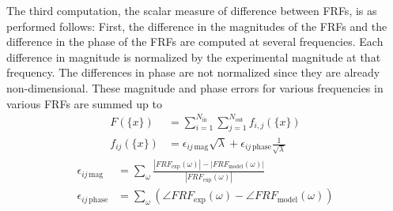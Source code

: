 The third computation, the scalar measure of difference between FRFs, is as performed follows:
First, the difference in the magnitudes of the FRFs and the difference in the phase of the FRFs are computed at several frequencies. Each difference in magnitude is normalized by the experimental magnitude at that frequency. The differences in phase are not normalized since they are already non-dimensional. These magnitude and phase errors for various frequencies in various FRFs are summed up to 
\begin{align}
	F(\{x\}) &= \sum_{i=1}^{N_\text{in}} \sum_{j=1}^{N_\text{out}} f_{i,j}(\{x\}) \\
	f_{ij}(\{x\}) &= \epsilon_{ij \, \text{mag}} \sqrt{\lambda} + \epsilon_{ij \, \text{phase}} \frac{1}{\sqrt{\lambda}}
\end{align}
\begin{align}
	\epsilon_{ij \, \text{mag}} &= \sum_\omega \frac{|FRF_\text{exp} (\omega)| - |FRF_\text{model} (\omega)|}{|FRF_\text{exp} (\omega)|} \\
	\label{eq:phaseCompare}
	\epsilon_{ij \, \text{phase}} &= \sum_\omega \left( \angle FRF_\text{exp} (\omega) - \angle FRF_\text{model} (\omega) \right)
\end{align}
